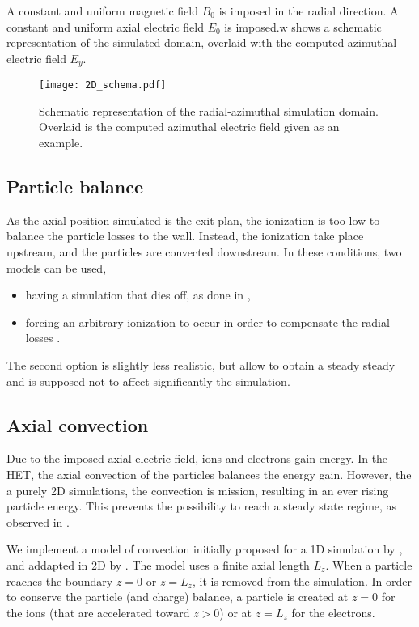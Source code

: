 A constant and uniform magnetic field $B_0$ is imposed in the radial direction.
A constant and uniform axial electric field $E_0$ is imposed.w
 shows a schematic representation of the simulated domain, overlaid with the computed azimuthal electric field $E_y$.

\begin{figure}[hbtp]
  \centering
  \texttt{[image: 2D\_schema.pdf]}
  \caption{Schematic representation of the radial-azimuthal simulation domain. Overlaid is the computed azimuthal electric field given as an example. }
  \label{fig-2dschemat}
\end{figure}

\subsection{Particle balance}
As the axial position simulated is the exit plan, the ionization is too low to balance the particle losses to the wall.
Instead, the ionization take place upstream, and the particles are convected downstream.
In these conditions, two models can be used,
\begin{itemize}
  \item having a simulation that dies off, as done in \citet{janhunen2018},
  \item forcing an arbitrary ionization to occur in order to compensate the radial losses \citep{dominguez-vazquez2018}.
\end{itemize}
The second option is slightly less realistic, but allow to obtain a steady steady and is supposed not to affect significantly the simulation.


\subsection{Axial convection}

Due to the imposed axial electric field, ions and electrons gain energy.
In the \ac{HET}, the axial convection of the particles balances the energy gain.
However, the a purely \ac{2D} simulations, the convection is mission, resulting in an ever rising particle energy.
This prevents the possibility to reach a steady state regime, as observed in \citet{heron2013,janhunen2018}.

We implement a model of convection initially proposed for a \ac{1D} simulation by \citet{lafleur2016a}, and addapted in \ac{2D} by \citet{croes2017a}.
The model uses a finite axial length $L_z$.
When a particle reaches the boundary $z=0$ or $z=L_z$, it is removed from the simulation.
In order to conserve the particle (and charge) balance, a particle is created at $z=0$ for the ions (that are accelerated toward $z>0$) or at $z=L_z$ for the electrons.

